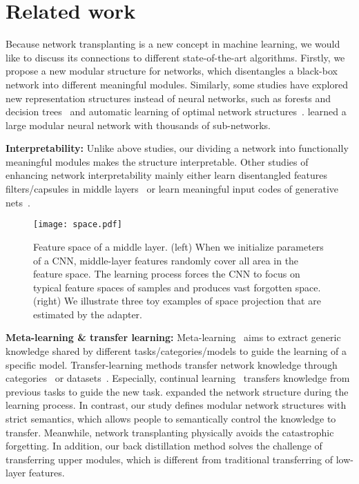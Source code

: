 \documentclass[10pt,twocolumn,letterpaper]{article}
\begin{document}
\section{Related work}
\label{sec:related}

Because network transplanting is a new concept in machine learning, we would like to discuss its connections to different state-of-the-art algorithms. Firstly, we propose a new modular structure for networks, which disentangles a black-box network into different meaningful modules. Similarly, some studies have explored new representation structures instead of neural networks, such as forests and decision trees~\cite{deepForest1,deepForest2,distillDecisionTree,RNNTree} and automatic learning of optimal network structures~\cite{LearnNetStruct1,LearnNetStruct2,LearnNetStruct3,LearnNetStruct4}. \cite{NetMixOfExperts} learned a large modular neural network with thousands of sub-networks.

\textbf{Interpretability:} Unlike above studies, our dividing a network into functionally meaningful modules makes the structure interpretable. Other studies of enhancing network interpretability mainly either learn disentangled features filters/capsules in middle layers~\cite{interpretableCNN,InterRCNN,capsule} or learn meaningful input codes of generative nets~\cite{infoGAN,betaVAE}.

\begin{figure*}[t]
\centering
\texttt{[image: space.pdf]}
\vspace{2pt}
\caption{Feature space of a middle layer. (left) When we initialize parameters of a CNN, middle-layer features randomly cover all area in the feature space. The learning process forces the CNN to focus on typical feature spaces of samples and produces vast forgotten space. (right) We illustrate three toy examples of space projection that are estimated by the adapter.}
\label{fig:space}
\end{figure*}

\textbf{Meta-learning \& transfer learning:} Meta-learning~\cite{meta1,meta2,meta3} aims to extract generic knowledge shared by different tasks/categories/models to guide the learning of a specific model. Transfer-learning methods transfer network knowledge through categories~\cite{CNNAnalysis_2} or datasets~\cite{UnsuperTransferCNN}. Especially, continual learning~\cite{ProgressiveNN,PathNet,continualLearning,LifelongLearning,metaContinual} transfers knowledge from previous tasks to guide the new task. \cite{ProgressiveNN,LifelongLearning} expanded the network structure during the learning process. In contrast, our study defines modular network structures with strict semantics, which allows people to semantically control the knowledge to transfer. Meanwhile, network transplanting physically avoids the catastrophic forgetting. In addition, our back distillation method solves the challenge of transferring upper modules, which is different from traditional transferring of low-layer features.
\end{document}
